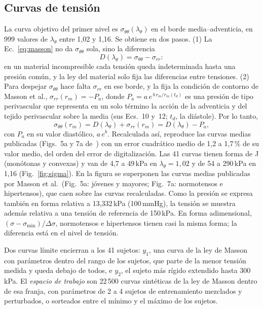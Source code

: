 \subsection{Curvas de tensión}\label{sec:sigma}
La curva objetivo del primer nivel es $\sigma_{\theta\theta}(\lambda_\theta)$ en el borde media--adventicia, en 999 valores de $\lambda_\theta$ entre 1,02 y 1,16. Se obtiene en dos pasos. (1) La Ec.~\eqref{eq:masson} no da $\sigma_{\theta\theta}$ sola, sino la diferencia
\[
D(\lambda_\theta)=\sigma_{\theta\theta}-\sigma_{rr}:
\]
en un material incompresible cada tensión queda indeterminada hasta una presión común, y la ley del material solo fija las diferencias entre tensiones. (2) Para despejar $\sigma_{\theta\theta}$ hace falta $\sigma_{rr}$ en ese borde, y la fija la condición de contorno de Masson et al., $\sigma_{rr}(r_m)=-P_a$, donde $P_a=a\,e^{\,b\,r_m/r_m(t_d)}$ es una presión de tipo perivascular que representa en un solo término la acción de la adventicia y del tejido perivascular sobre la media (sus Ecs.~10 y~12; $t_d$, la diástole). Por lo tanto,
\begin{equation}\label{eq:sigmaobj}
\sigma_{\theta\theta}(r_m)=D(\lambda_\theta)+\sigma_{rr}(r_m)=D(\lambda_\theta)-P_a,
\end{equation}
con $P_a$ en su valor diastólico, $a\,e^{b}$. Recalculada así, reproduce las curvas medias publicadas (Figs.~5a y 7a de~\cite{masson}) con un error cuadrático medio de 1,2 a 1,7\,\% de su valor medio, del orden del error de digitalización. Las 41 curvas tienen forma de J (monótonas y convexas) y van de 4,7 a 49\,kPa en $\lambda_\theta=1{,}02$ y de 54 a 290\,kPa en 1,16 (Fig.~\ref{fig:sigma}). En la figura se superponen las curvas medias publicadas por Masson et al.\ (Fig.~5a: jóvenes y mayores; Fig.~7a: normotensos e hipertensos), que caen sobre las curvas recalculadas. Como la presión se expresa también en forma relativa a 13,332\,kPa (100\,mmHg), la tensión se muestra además relativa a una tensión de referencia de 150\,kPa. En forma adimensional, $(\sigma-\sigma_{\min})/\Delta\sigma$, normotensos e hipertensos tienen casi la misma forma; la diferencia está en el nivel de tensión.

Dos curvas límite encierran a los 41 sujetos: $y_1$, una curva de la ley de Masson con parámetros dentro del rango de los sujetos, que parte de la menor tensión medida y queda debajo de todos, e $y_2$, el sujeto más rígido extendido hasta 300\,kPa. El \emph{espacio de trabajo} son 22\,500 curvas sintéticas de la ley de Masson dentro de esa franja, con parámetros de 2 a 4 sujetos de entrenamiento mezclados y perturbados, o sorteados entre el mínimo y el máximo de los sujetos.

